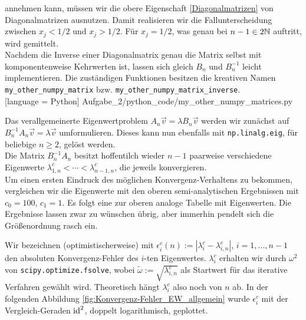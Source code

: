 annehmen kann, müssen wir die obere Eigenschaft \eqref{Diagonalmatrizen} von Diagonalmatrizen ausnutzen. Damit realisieren wir die Fallunterscheidung zwischen $x_j < 1/2$ und $x_j > 1/2$. Für $x_j = 1/2$, was genau bei $n-1 \in 2 \mathbb{N}$ auftritt, wird gemittelt. \\

Nachdem die Inverse einer Diagonalmatrix genau die Matrix selbst mit komponentenweise Kehrwerten ist, lassen sich gleich $B_n$ und $B_n^{-1}$ leicht implementieren. Die zuständigen Funktionen besitzen die kreativen Namen \verb|my_other_numpy_matrix| bzw. \verb|my_other_numpy_matrix_inverse|. \\


[language = Python]
{Aufgabe_2/python_code/my_other_numpy_matrices.py}

Das verallgemeinerte Eigenwertproblem $A_n \vec v = \lambda B_n \vec v$ werden wir zunächst auf $B_n^{-1} A_n \vec v = \lambda \vec v$ umformulieren. Dieses kann nun ebenfalls mit \verb|np.linalg.eig|, für beliebige $n \geq 2$, gelöst werden. \\

Die Matrix $B_n^{-1} A_n$ besitzt hoffentilch wieder $n-1$ paarweise verschiedene Eigenwerte $\lambda^c_{1, n} < \cdots < \lambda^c_{n-1, n}$, die jeweils konvergieren. \\

Um einen ersten Eindruck des möglichen Konvergenz-Verhaltens zu bekommen, vergleichen wir die Eigenwerte mit den oberen semi-analytischen Ergebnissen mit $c_0 = 100$, $c_1 = 1$. Es folgt eine zur oberen analoge Tabelle mit Eigenwerten. Die Ergebnisse lassen zwar zu wünschen übrig, aber immerhin pendelt sich die Größenordnung rasch ein. \\


\vspace{10pt}

Wir bezeichnen (optimistischerweise) mit $\epsilon_i^c(n) := |\lambda_i^c - \lambda_{i, n}^c|$, $i = 1, \ldots, n-1$ den absoluten Konvergenz-Fehler des $i$-ten Eigenwertes. $\lambda_i^c$ erhalten wir durch $\omega^2$ von \verb|scipy.optimize.fsolve|, wobei $\tilde \omega := \sqrt{\lambda_{i, n}^c}$ als Startwert für das iterative Verfahren gewählt wird. Theoretisch hängt $\lambda_i^c$ also noch von $n$ ab. In der folgenden Abbildung \ref{fig:Konvergenz-Fehler_EW_allgemein} wurde $\epsilon^c_i$ mit der Vergleich-Geraden $\text{id}^2$, doppelt logarithmisch, geplottet. \\

